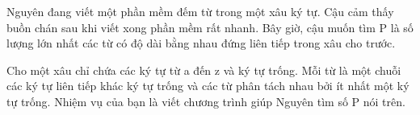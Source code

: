 Nguyên đang viết một phần mềm đếm từ trong một xâu ký tự. Cậu cảm thấy buồn chán sau khi viết xong phần mềm rất nhanh. Bây giờ, cậu muốn tìm P là số lượng lớn nhất các từ có độ dài bằng nhau đứng liên tiếp trong xâu cho trước.  

   Cho một xâu chỉ chứa các ký tự từ a đến z và ký tự trống. Mỗi từ là một chuỗi các ký tự liên tiếp khác ký tự trống và các từ phân tách nhau bởi ít nhất một ký tự trống. Nhiệm vụ của bạn là viết chương trình giúp Nguyên tìm số P nói trên.  

\